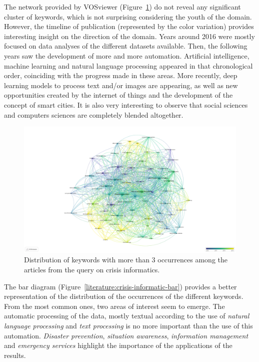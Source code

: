 The network provided by VOSviewer (Figure~\ref{literature:crisis-informatic-overlay}) do not reveal any significant cluster of keywords, which is not surprising considering the youth of the domain.
However, the timeline of publication (represented by the color variation) provides interesting insight on the direction of the domain.
Years around 2016 were mostly focused on data analyses of the different datasets available.
Then, the following years saw the development of more and more automation.
Artificial intelligence, machine learning and natural language processing appeared in that chronological order, coinciding with the progress made in these areas.
More recently, deep learning models to process text and/or images are appearing, as well as new opportunities created by the internet of things and the development of the concept of smart cities.
It is also very interesting to observe that social sciences and computers sciences are completely blended altogether.

\begin{landscape}
    \begin{figure}[htb]
        \includegraphics[width=\paperwidth,height=\paperheight,keepaspectratio]{figures/chap-2/crisis-informatic-overlay.pdf}
        \caption{Distribution of keywords with more than 3 occurrences among the articles from the query on crisis informatics. }
        \label{literature:crisis-informatic-overlay}
    \end{figure}
\end{landscape}

The bar diagram (Figure~\ref{literature:crisis-informatic-bar}) provides a better representation of the distribution of the occurrences of the different keywords.
From the most common ones, two areas of interest seem to emerge.
The automatic processing of the data, mostly textual according to the use of \emph{natural language processing} and \emph{text processing} is no more important than the use of this automation.
\emph{Disaster prevention}, \emph{situation awareness}, \emph{information management} and \emph{emergency services} highlight the importance of the applications of the results.

